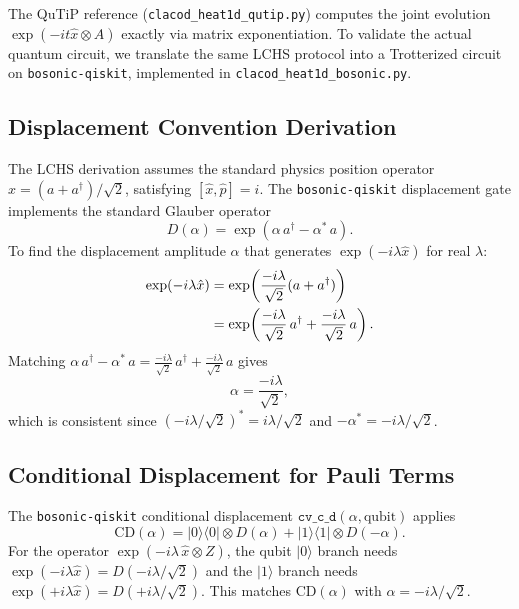 \documentclass[11pt]{article}
\begin{document}
The QuTiP reference (\texttt{clacod\_heat1d\_qutip.py}) computes the joint
evolution $\exp(-it\hat{x}\otimes A)$ exactly via matrix exponentiation.
To validate the actual quantum circuit, we translate the same LCHS protocol
into a Trotterized circuit on \texttt{bosonic-qiskit}, implemented in
\texttt{clacod\_heat1d\_bosonic.py}.

\subsection{Displacement Convention Derivation}

The LCHS derivation assumes the standard physics position operator
$\hat{x} = (a+a^\dagger)/\sqrt{2}$, satisfying $[\hat{x},\hat{p}]=i$.
The \texttt{bosonic-qiskit} displacement gate implements the standard
Glauber operator
\begin{equation}
  D(\alpha) = \exp(\alpha\, a^\dagger - \alpha^*\, a).
\end{equation}
To find the displacement amplitude $\alpha$ that generates
$\exp(-i\lambda\hat{x})$ for real $\lambda$:
\begin{align}
  \exp(-i\lambda\hat{x})
  &= \exp\!\left(\frac{-i\lambda}{\sqrt{2}}(a + a^\dagger)\right) \notag\\
  &= \exp\!\left(\frac{-i\lambda}{\sqrt{2}}\,a^\dagger
    + \frac{-i\lambda}{\sqrt{2}}\,a\right).
\end{align}
Matching $\alpha\,a^\dagger - \alpha^*\,a
= \tfrac{-i\lambda}{\sqrt{2}}\,a^\dagger + \tfrac{-i\lambda}{\sqrt{2}}\,a$
gives
\begin{equation}\label{eq:disp-alpha}
  \boxed{\alpha = \frac{-i\lambda}{\sqrt{2}},}
\end{equation}
which is consistent since $(-i\lambda/\sqrt{2})^* = i\lambda/\sqrt{2}$
and $-\alpha^* = -i\lambda/\sqrt{2}$.

\subsection{Conditional Displacement for Pauli Terms}

The \texttt{bosonic-qiskit} conditional displacement
$\texttt{cv\_c\_d}(\alpha, \text{qubit})$ applies
\begin{equation}
  \mathrm{CD}(\alpha) = |0\rangle\!\langle 0|\otimes D(\alpha)
  + |1\rangle\!\langle 1|\otimes D(-\alpha).
\end{equation}
For the operator $\exp(-i\lambda\,\hat{x}\otimes Z)$, the qubit $|0\rangle$
branch needs $\exp(-i\lambda\hat{x}) = D(-i\lambda/\sqrt{2})$ and
the $|1\rangle$ branch needs $\exp(+i\lambda\hat{x}) = D(+i\lambda/\sqrt{2})$.
This matches $\mathrm{CD}(\alpha)$ with $\alpha = -i\lambda/\sqrt{2}$.
\end{document}
